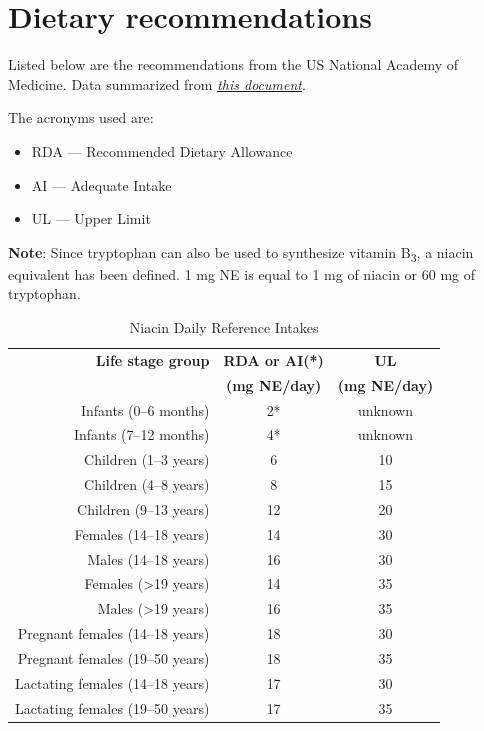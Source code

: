\documentclass{book}
\begin{document}
\begin{sloppypar}
\section{Dietary recommendations}
Listed below are the recommendations from the US National Academy of Medicine. Data summarized from \href{https://nap.nationalacademies.org/read/6015/chapter/8}{\textit{this document}}.

The acronyms used are:
\begin{itemize}
	\item RDA --- Recommended Dietary Allowance
	\item AI --- Adequate Intake
	\item UL --- Upper Limit
\end{itemize}

\textbf{Note}: Since tryptophan can also be used to synthesize vitamin B\textsubscript{3}, a niacin equivalent has been defined.
1 mg NE is equal to 1 mg of niacin or 60 mg of tryptophan.

\begin{table}[ht]
	\caption{Niacin Daily Reference Intakes}
	\centering \begin{tabular}{| r | c | c |}
		\hline
		\textbf{Life stage group}			& \textbf{RDA or AI(*)}	& \textbf{UL}			\\
											& \textbf{(mg NE/day)}	& \textbf{(mg NE/day)}	\\ \hline
		Infants (0--6 months)				& 2*					& unknown				\\ \hline
		Infants (7--12 months)				& 4*					& unknown				\\ \hline
		Children (1--3 years)				& 6						& 10					\\ \hline
		Children (4--8 years)				& 8						& 15					\\ \hline
		Children (9--13 years)				& 12					& 20					\\ \hline
		Females (14--18 years)				& 14					& 30					\\ \hline
		Males (14--18 years)				& 16					& 30					\\ \hline
		Females (\textgreater19 years)		& 14					& 35					\\ \hline
		Males (\textgreater19 years)		& 16					& 35					\\ \hline
		Pregnant females (14--18 years)		& 18					& 30					\\ \hline
		Pregnant females (19--50 years)		& 18					& 35					\\ \hline
		Lactating females (14--18 years)	& 17					& 30					\\ \hline
		Lactating females (19--50 years)	& 17					& 35					\\ \hline
	\end{tabular}
\end{table}
\newpage


\end{sloppypar}
\end{document}
